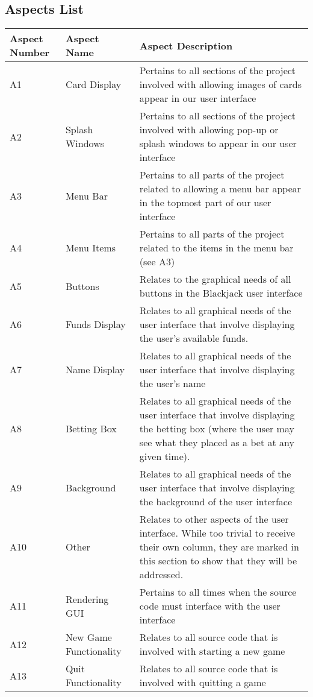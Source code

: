 \documentclass [landscape, 12pt] {article}
\begin{document}
\subsection {Aspects List}
		\begin {longtable}{p{4cm} p{4cm} p{10cm}}
			\hline\hline
			Aspect Number & Aspect Name& Aspect Description \\[0.5ex]
			\hline
			A1 & Card Display & Pertains to all sections of the project involved with allowing images of cards appear in our user interface\\
			A2 & Splash Windows & Pertains to all sections of the project involved with allowing pop-up or splash windows to appear in our user interface\\
			A3 & Menu Bar & Pertains to all parts of the project related to allowing a menu bar appear in the topmost part of our user interface\\
			A4 & Menu Items & Pertains to all parts of the project related to the items in the menu bar (see A3)\\
			A5 & Buttons & Relates to the graphical needs of all buttons in the Blackjack user interface \\
			A6 & Funds Display & Relates to all graphical needs of the user interface that involve displaying the user's available funds.  \\ 
			A7 & Name Display & Relates to all graphical needs of the user interface that involve displaying the user's name\\
			A8 & Betting Box & Relates to all graphical needs of the user interface that involve displaying the betting box (where the user may see what they placed as a bet at any given time).\\
			A9 & Background & Relates to all graphical needs of the user interface that involve displaying the background of the user interface\\
			A10 & Other & Relates to other aspects of the user interface.  While too trivial to receive their own column, they are marked in this section to show that they will be addressed.  \\
			A11 & Rendering GUI & Pertains to all times when the source code must interface with the user interface\\
			A12 & New Game Functionality & Relates to all source code that is involved with starting a new game \\
			A13 & Quit Functionality & Relates to all source code that is involved with quitting a game\\

\end{longtable}
\end{document}
